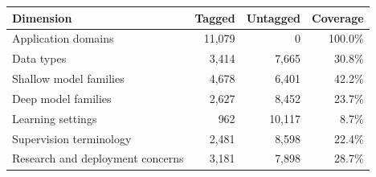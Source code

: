 \begin{tabular}{lrrr}
\toprule
Dimension & Tagged & Untagged & Coverage \\
\midrule
Application domains & 11,079 & 0 & 100.0\% \\
Data types & 3,414 & 7,665 & 30.8\% \\
Shallow model families & 4,678 & 6,401 & 42.2\% \\
Deep model families & 2,627 & 8,452 & 23.7\% \\
Learning settings & 962 & 10,117 & 8.7\% \\
Supervision terminology & 2,481 & 8,598 & 22.4\% \\
Research and deployment concerns & 3,181 & 7,898 & 28.7\% \\
\bottomrule
\end{tabular}
